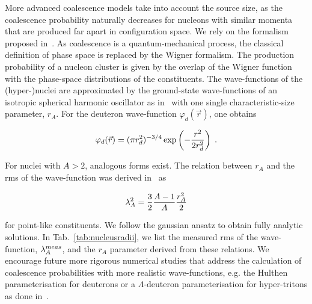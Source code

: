 \documentclass[%
 reprint,
 amsmath,amssymb,
 aps,
]{revtex4-1}
\begin{document}
More advanced coalescence models \cite{Sato:1981ez, Nagle:1996vp, Scheibl:1998tk} take into account the source size, as the coalescence probability naturally decreases for nucleons with similar momenta that are produced far apart in configuration space. We rely on the formalism proposed in~\cite{Scheibl:1998tk}.
As coalescence is a quantum-mechanical process, the classical definition of phase space is replaced by the Wigner formalism. The production probability of a nucleon cluster is given by the overlap of the Wigner function with the phase-space distributions of the constituents.
The wave-functions of the (hyper-)nuclei are approximated by the ground-state wave-functions of an isotropic spherical harmonic oscillator as in~\cite{Scheibl:1998tk} with one single characteristic-size parameter, $r_{A}$. 
For the deuteron wave-function $\varphi_{d}(\vec{r}) $, one obtains

\begin{equation}\label{eq:WaveHeinz}
 \varphi_{d}(\vec{r}) = (\pi r_{d}^2)^{-3/4} \exp\left(-{r^2 \over 2 r_{d}^2}\right) \;.
\end{equation}

\noindent For nuclei with $A > 2$, analogous forms exist. The relation between $r_{A}$ and the rms of the wave-function was derived in~\cite{Shebeko:2006ud} as

\begin{equation}
 \lambda_{A}^2 = {3 \over 2}{A - 1 \over A} {r_{A}^2 \over 2}
\end{equation} 

\noindent for point-like constituents. 
We follow the gaussian ansatz to obtain fully analytic solutions.
In Tab.~\ref{tab:nucleusradii}, we list the measured rms of the wave-function, $\lambda_{A}^{meas}$, and the $r_{A}$ parameter derived from these relations. 
We encourage future more rigorous numerical studies that address the calculation of coalescence probabilities with more realistic wave-functions, e.g. the Hulthen parameterisation for deuterons \cite{Nagle:1996vp} or a $\Lambda$-deuteron parameterisation for hyper-tritons as done in~\cite{Zhang:2018euf, Sun:2018mqq}. 
\end{document}
